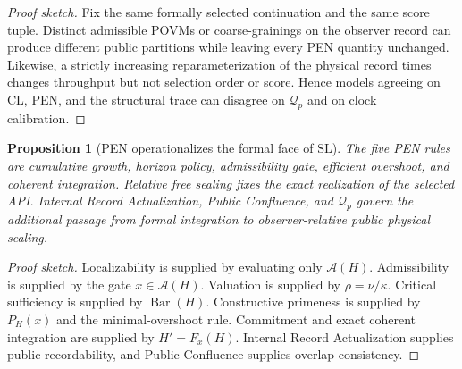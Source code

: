 \documentclass[11pt]{article}
\theoremstyle{plain}
\newtheorem{proposition}[theorem]{Proposition}
\theoremstyle{definition}
\theoremstyle{remark}
\newenvironment{proofsketch}{\begin{proof}[Proof sketch]}{\end{proof}}
\newcommand{\CL}{\mathrm{CL}}
\newcommand{\SLaw}{\mathrm{SL}}
\newcommand{\A}{\mathcal{A}}
\newcommand{\SelBar}{\operatorname{Bar}}
\begin{document}
\begin{proofsketch}
Fix the same formally selected continuation and the same score tuple. Distinct admissible POVMs or coarse-grainings on the observer record can produce different public partitions while leaving every PEN quantity unchanged. Likewise, a strictly increasing reparameterization of the physical record times changes throughput but not selection order or score. Hence models agreeing on \(\CL\), PEN, and the structural trace can disagree on \(\mathcal{Q}_p\) and on clock calibration.
\end{proofsketch}

\begin{proposition}[PEN operationalizes the formal face of \(\SLaw\)]
The five PEN rules are cumulative growth, horizon policy, admissibility gate, efficient overshoot, and coherent integration. Relative free sealing fixes the exact realization of the selected API. Internal Record Actualization, Public Confluence, and \(\mathcal{Q}_p\) govern the additional passage from formal integration to observer-relative public physical sealing.
\end{proposition}

\begin{proofsketch}
Localizability is supplied by evaluating only \(\A(H)\). Admissibility is supplied by the gate \(x\in\A(H)\). Valuation is supplied by \(\rho=\nu/\kappa\). Critical sufficiency is supplied by \(\SelBar(H)\). Constructive primeness is supplied by \(P_H(x)\) and the minimal-overshoot rule. Commitment and exact coherent integration are supplied by \(H'=F_x(H)\). Internal Record Actualization supplies public recordability, and Public Confluence supplies overlap consistency.
\end{proofsketch}
\end{document}

